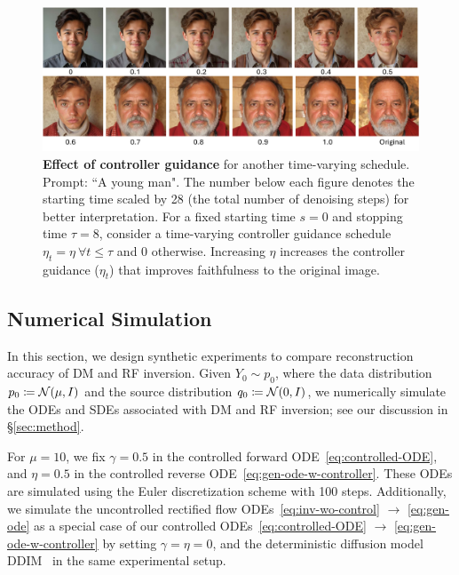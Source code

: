 \documentclass{article} %
\theoremstyle{plain}
\begin{document}
\begin{figure}[!tbh]
\includegraphics[width=\linewidth]{pics/ablation-fixed-stop-time-8-fixed-eta-diff-values_low.pdf}
\caption{
\textbf{Effect of controller guidance} for another time-varying schedule. 
Prompt: ``A young man". 
The number below each figure denotes the starting time scaled by 28 (the total number of denoising steps) for better interpretation.
For a fixed starting time $s=0$ and stopping time $\tau=8$, consider a time-varying controller guidance schedule $\eta_t = \eta ~\forall t \leq \tau$ and $0$ otherwise. 
Increasing $\eta$ increases the controller guidance ($\eta_t$) that improves faithfulness to the original image.
}
\label{fig:control-strength-all}
\end{figure}


\subsection{Numerical Simulation}
\label{sec:num_sim}
In this section, we design synthetic experiments to compare reconstruction accuracy of DM and RF inversion.
Given $Y_0 \sim p_0$, where the data distribution $p_0\coloneqq {\mathcal{N}}(\mu,I)$ and the source distribution $q_0 \coloneqq {\mathcal{N}}(0,I)$, we numerically simulate the ODEs and SDEs associated with DM and RF inversion; see our discussion in \S\ref{sec:method}. 



For $\mu=10$, we fix $\gamma=0.5$ in the controlled forward ODE~\eqref{eq:controlled-ODE}, and $\eta=0.5$ in the controlled reverse ODE~\eqref{eq:gen-ode-w-controller}.
These ODEs are simulated using the Euler discretization scheme with 100 steps. 
Additionally, we simulate the uncontrolled rectified flow ODEs~\eqref{eq:inv-wo-control} $\rightarrow$ \eqref{eq:gen-ode} as a special case of our controlled ODEs~\eqref{eq:controlled-ODE} $\rightarrow$ \eqref{eq:gen-ode-w-controller} by setting $\gamma=\eta=0$, and the deterministic diffusion model DDIM~\citep{ddim} in the same experimental setup. 
\end{document}
